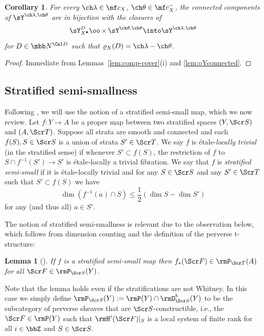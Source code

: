 \documentclass[final]{amsart}
\newtheorem{lem}[subsubsection]{Lemma}
\newtheorem{cor}[subsubsection]{Corollary}
\theoremstyle{remark}
\theoremstyle{definition}
\DeclareMathOperator*{\xt}{\times}
\numberwithin{equation}{section}
\begin{document}
\begin{cor} \label{cor:Ycomp2}
For every $\ch\lambda\in\mf c_X$, $\ch\theta\in\mf c_X^-$, the connected components of $\sY^{\ch\lambda,\ch\theta}$ are
in bijection with the closures of 
\[ \sY^{D}_{X^\bullet} \oo\xt \sY^{\ch\theta,\ch\theta} \into \sY^{\ch\lambda,\ch\theta} \]
for $D\in \mbb N^{\Cal D}$ such that $\varrho_X(D) = \ch\lambda-\ch\theta$. 
\end{cor}
\begin{proof}
Immediate from Lemmas~\ref{lem:comp-cover}(i) and \ref{lem:oYconnected}.
\end{proof}


\subsection{Stratified semi-smallness} \label{sect:semismall}

Following \cite[\S 4]{MV}, we will use  
the notion of a stratified semi-small map, which we now review.
Let $f : Y \to A$ be a proper map between two stratified spaces 
$(Y,\Scr S)$ and $(A,\Scr T)$. Suppose all strata 
are smooth and connected and each $f(S), S\in \Scr S$ is a union of strata 
$S' \in \Scr T$. We say $f$ is \'etale-\emph{locally trivial} 
(in the stratified sense) if whenever $S' \subset f(S)$, the restriction of 
$f$ to $S\cap f^{-1}(S') \to S'$ is \'etale-locally
a trivial fibration. We say that $f$ is \emph{stratified semi-small} 
if it is \'etale-locally trivial and 
for any $S\in \Scr S$ and any $S'\in \Scr T$ such that
$S' \subset f(S)$ we have 
\begin{equation} \label{e:ss-ineq}
    \dim ( f^{-1}(a) \cap S) \le \frac 1 2 (\dim S - \dim S') 
\end{equation}
for any (and thus all) $a\in S'$. 

The notion of stratified semi-smallness is relevant due to 
the observation below, which follows from dimension counting and the 
definition of the perverse t-structure:

\begin{lem}[{\cite[Lemma 4.3]{MV}}]  \label{lem:semismallperverse}
If $f$ is a stratified semi-small map then $f_*(\Scr F) \in \rmP_{\Scr T}(A)$ for all 
$\Scr F \in \rmP_{\Scr S}(Y)$. 
\end{lem}

Note that the lemma holds even if the stratifications are not Whitney. 
In this case we simply define $\rmP_{\Scr S}(Y) := \rmP(Y) \cap \rmD^b_{\Scr S}(Y)$
to be the subcategory of perverse sheaves that are $\Scr S$-constructible, i.e., 
the $\Scr F \in \rmP(Y)$ such that $\rmH^i(\Scr F)|_S$ is a local system
of finite rank for all $i\in \bbZ$ and $S\in \Scr S$. 
\end{document}
